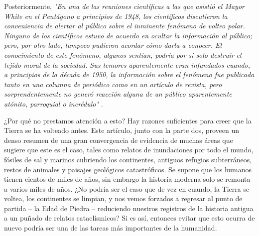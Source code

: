 \documentclass[10pt,twocolumn,letterpaper]{article}
\begin{document}
Posteriormente, \textit{"En una de las reuniones científicas a las que asistió el Mayor White en el Pentágono a principios de 1948, los científicos discutieron la conveniencia de alertar al público sobre el inminente fenómeno de volteo polar. Ninguno de los científicos estuvo de acuerdo en ocultar la información al público; pero, por otro lado, tampoco pudieron acordar cómo darla a conocer. El conocimiento de este fenómeno, algunos sentían, podría por sí solo destruir el tejido moral de la sociedad. Sus temores aparentemente eran infundados cuando, a principios de la década de 1950, la información sobre el fenómeno fue publicada tanto en una columna de periódico como en un artículo de revista, pero sorprendentemente no generó reacción alguna de un público aparentemente atónito, parroquial o incrédulo"} \cite{138,139}.

¿Por qué no prestamos atención a esto? Hay razones suficientes para creer que la Tierra se ha volteado antes. Este artículo, junto con la parte dos, proveen un denso resumen de una gran convergencia de evidencia de muchas áreas que sugiere que este es el caso, tales como relatos de inundaciones por todo el mundo, fósiles de sal y marinos cubriendo los continentes, antiguos refugios subterráneos, restos de animales y paisajes geológicos catastróficos. Se supone que los humanos tienen cientos de miles de años, sin embargo la historia moderna solo se remonta a varios miles de años. ¿No podría ser el caso que de vez en cuando, la Tierra se voltea, los continentes se limpian, y nos vemos forzados a regresar al punto de partida – la Edad de Piedra – reduciendo nuestros registros de la historia antigua a un puñado de relatos cataclísmicos? Si es así, entonces evitar que esto ocurra de nuevo podría ser una de las tareas más importantes de la humanidad.
\end{document}
